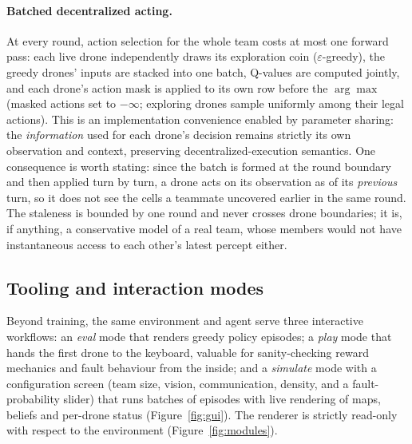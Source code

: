 \paragraph{Batched decentralized acting.}
At every round, action selection for the whole team costs at most one forward
pass: each live drone independently draws its exploration coin
($\varepsilon$-greedy), the greedy drones' inputs are stacked into one batch,
Q-values are computed jointly, and each drone's action mask is applied to its own
row before the $\arg\max$ (masked actions set to $-\infty$; exploring drones
sample uniformly among their legal actions). This is an implementation
convenience enabled by parameter sharing: the \emph{information} used for each
drone's decision remains strictly its own observation and context, preserving
decentralized-execution semantics. One consequence is worth stating: since the
batch is formed at the round boundary and then applied turn by turn, a drone
acts on its observation as of its \emph{previous} turn, so it does not see the
cells a teammate uncovered earlier in the same round. The staleness is bounded
by one round and never crosses drone boundaries; it is, if anything, a
conservative model of a real team, whose members would not have instantaneous
access to each other's latest percept either.

\subsection{Tooling and interaction modes}
\label{subsec:arch-tooling}

Beyond training, the same environment and agent serve three interactive
workflows: an \emph{eval} mode that renders greedy policy episodes; a
\emph{play} mode that hands the first drone to the keyboard, valuable for
sanity-checking reward mechanics and fault behaviour from the inside; and a
\emph{simulate} mode with a configuration screen (team size, vision,
communication, density, and a fault-probability slider) that runs batches of
episodes with live rendering of maps, beliefs and per-drone status
(Figure~\ref{fig:gui}). The renderer is strictly read-only with respect to the
environment (Figure~\ref{fig:modules}).

